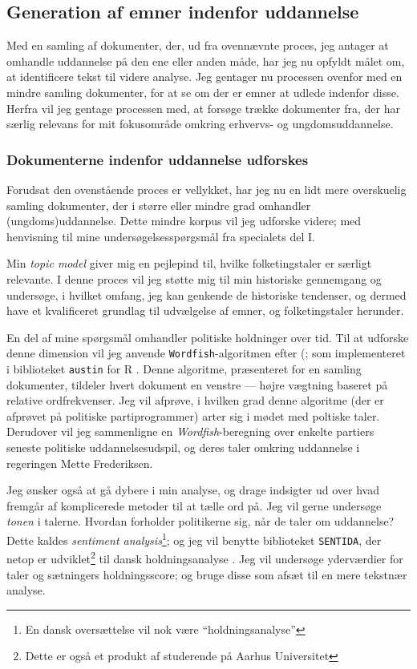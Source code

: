 \subsection{Generation af emner indenfor uddannelse}
Med en samling af dokumenter, der, ud fra ovennævnte proces, jeg antager at omhandle uddannelse på den ene eller anden måde, har jeg nu opfyldt målet om, at identificere tekst til videre analyse.
Jeg gentager nu processen ovenfor med en mindre samling dokumenter, for at se om der er emner at udlede indenfor disse.
Herfra vil jeg gentage processen med, at forsøge trække dokumenter fra, der har særlig relevans for mit fokusområde omkring erhvervs- og ungdomsuddannelse.

\subsubsection{Dokumenterne indenfor uddannelse udforskes}
Forudsat den ovenstående proces er vellykket, har jeg nu en lidt mere overskuelig samling dokumenter, der i større eller mindre grad omhandler (ungdoms)uddannelse.
Dette mindre korpus vil jeg udforske videre; med henvisning til mine undersøgelsesspørgsmål fra specialets del I.

Min \textit{topic model} giver mig en pejlepind til, hvilke folketingstaler er særligt relevante.
I denne proces vil jeg støtte mig til min historiske gennemgang og undersøge, i hvilket omfang, jeg kan genkende de historiske tendenser, og dermed have et kvalificeret grundlag til udvælgelse af emner, og folketingstaler herunder.

En del af mine spørgsmål omhandler politiske holdninger over tid. Til at udforske denne dimension vil jeg anvende \texttt{Wordfish}-algoritmen efter \citeauthor{slapinScalingModelEstimating2008} (\citeyear{slapinScalingModelEstimating2008}; som implementeret i biblioteket \texttt{austin} for R \autocite{loweAustinPackageDoing2019}.
Denne algoritme, præsenteret for en samling dokumenter, tildeler hvert dokument en venstre — højre vægtning baseret på relative ordfrekvenser.
Jeg vil afprøve, i hvilken grad denne algoritme (der er afprøvet på politiske partiprogrammer) arter sig i mødet med poltiske taler.
Derudover vil jeg sammenligne en \textit{Wordfish}-beregning over enkelte partiers seneste politiske uddannelsesudspil, og deres taler omkring uddannelse i regeringen Mette Frederiksen.

Jeg ønsker også at gå dybere i min analyse, og drage indsigter ud over hvad fremgår af komplicerede metoder til at tælle ord på.
Jeg vil gerne undersøge \textit{tonen} i talerne.
Hvordan forholder politikerne sig, når de taler om uddannelse?
Dette kaldes \textit{sentiment analysis}\footnote{En dansk oversættelse vil nok være “holdningsanalyse”}; og jeg vil benytte biblioteket \texttt{SENTIDA}, der netop er udviklet\footnote{Dette er også et produkt af studerende på Aarhus Universitet} til dansk holdningsanalyse \autocite{lauridsenSentida2020}.
Jeg vil undersøge yderværdier for taler og sætningers holdningsscore; og bruge disse som afsæt til en mere tekstnær analyse.

